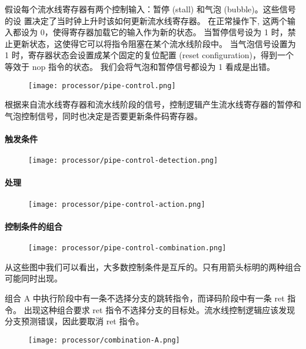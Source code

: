 假设每个流水线寄存器有两个控制输入：暂停 (stall) 和气泡 (bubble)。这些信号的设
置决定了当时钟上升时该如何更新流水线寄存器。
在正常操作下, 这两个输入都设为 0，使得寄存器加载它的输入作为新的状态。
当暂停信号设为 1 时，禁止更新状态，这使得它可以将指令阻塞在某个流水线阶段中。
当气泡信号设置为 1 时，寄存器状态会设置成某个固定的复位配置 (reset configuration)，得到一个等效于 nop 指令的状态。
我们会将气泡和暂停信号都设为 1 看成是出错。

\begin{figure}[H]
    \centering
    \texttt{[image: processor/pipe-control.png]}
\end{figure}

根据来自流水线寄存器和流水线阶段的信号，控制逻辑产生流水线寄存器的暂停和气泡控制信号，同时也决定是否要更新条件码寄存器。

\paragraph{触发条件}
\begin{figure}[H]
    \centering
    \texttt{[image: processor/pipe-control-detection.png]}
\end{figure}

\paragraph{处理}

\begin{figure}[H]
    \centering
    \texttt{[image: processor/pipe-control-action.png]}
\end{figure}

\paragraph{控制条件的组合}

\begin{figure}[H]
    \centering
    \texttt{[image: processor/pipe-control-combination.png]}
\end{figure}

从这些图中我们可以看出，大多数控制条件是互斥的。只有用箭头标明的两种组合可能同时出现。

组合 A 中执行阶段中有一条不选择分支的跳转指令，而译码阶段中有一条 ret 指令。
出现这种组合要求 ret 指令不选择分支的目标处。流水线控制逻辑应该发现分支预测错误，因此要取消 ret 指令。
\begin{figure}[H]
    \centering
    \texttt{[image: processor/combination-A.png]}
\end{figure}

